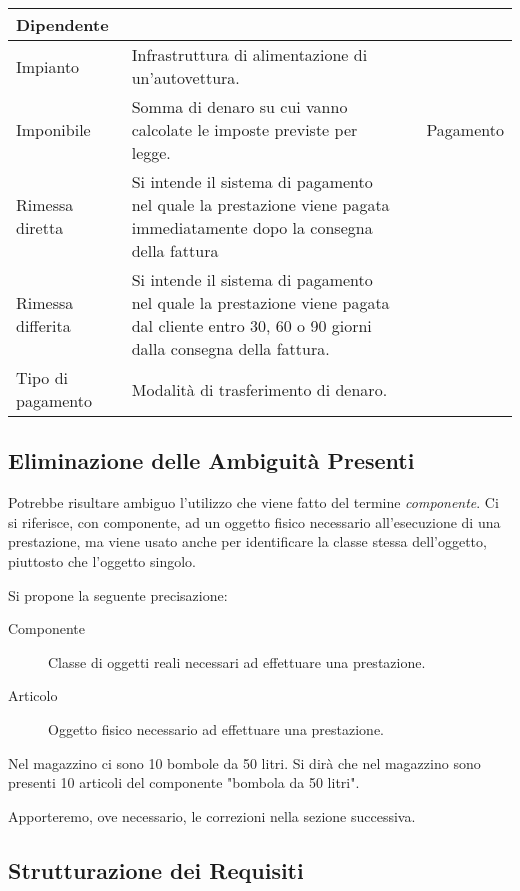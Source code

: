 \begin{longtable}{| p{2.5cm} | p{4.5cm} | p{2cm} | p{2.5cm} |}
			Dipendente 
			\\ \hline
			Impianto & 
			Infrastruttura di alimentazione di un’autovettura.
			&&\\ \hline
			Imponibile &
			Somma di denaro su cui vanno calcolate le imposte previste per legge. &&
			Pagamento 
			\\ \hline
			Rimessa diretta &
			Si intende il sistema di pagamento nel quale la prestazione viene pagata immediatamente dopo la consegna della fattura &
			& \\ \hline
			Rimessa differita &
			Si intende il sistema di pagamento nel quale la prestazione viene pagata dal cliente entro 30, 60 o 90 giorni dalla consegna della fattura. &
			& \\ \hline
			Tipo di pagamento &
			Modalità di trasferimento di denaro. &
			& \\ \hline
				
		\end{longtable}
		
	\subsection{Eliminazione delle Ambiguità Presenti}
		
		Potrebbe risultare ambiguo l'utilizzo che viene fatto del termine \emph{componente}. Ci si riferisce, con componente, ad un oggetto fisico necessario all'esecuzione di una prestazione, ma viene usato anche per identificare la classe stessa dell'oggetto, piuttosto che l'oggetto singolo.
		
		Si propone la seguente precisazione:
		\begin{description}
			\item[Componente]
				Classe di oggetti reali necessari ad effettuare una prestazione.
			\item[Articolo]
				Oggetto fisico necessario ad effettuare una prestazione.
		\end{description}
		
		\begin{example}
			Nel magazzino ci sono 10 bombole da 50 litri. Si dirà che nel magazzino sono presenti 10 articoli del componente "bombola da 50 litri".
		\end{example}
		
		Apporteremo, ove necessario, le correzioni nella sezione successiva.
		
	\subsection{Strutturazione dei Requisiti}
	
